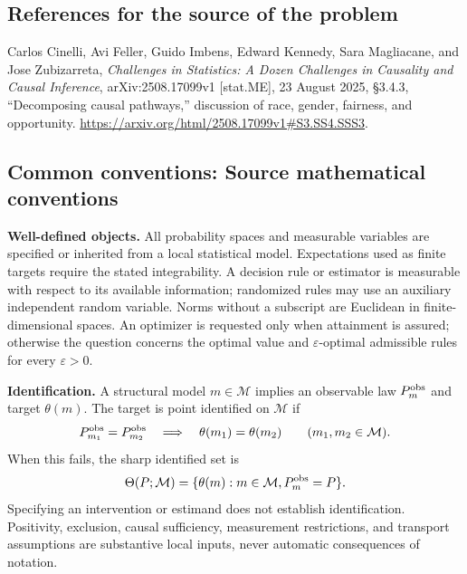 \documentclass[11pt,a4paper]{article}
\begin{document}
\subsection*{References for the source of the problem}
Carlos Cinelli, Avi Feller, Guido Imbens, Edward Kennedy, Sara Magliacane, and Jose Zubizarreta, \emph{Challenges in Statistics: A Dozen Challenges in Causality and Causal Inference}, arXiv:2508.17099v1 [stat.ME], 23 August 2025, \S3.4.3, ``Decomposing causal pathways,'' discussion of race, gender, fairness, and opportunity. \url{https://arxiv.org/html/2508.17099v1#S3.SS4.SSS3}.

\subsection*{Common conventions: Source mathematical conventions}

\textbf{Well-defined objects.}
All probability spaces and measurable variables are specified or inherited
from a local statistical model. Expectations used as finite targets require
the stated integrability. A decision rule or estimator is measurable with
respect to its available information; randomized rules may use an auxiliary
independent random variable. Norms without a subscript are Euclidean in
finite-dimensional spaces. An optimizer is requested only when attainment
is assured; otherwise the question concerns the optimal value and
$\varepsilon$-optimal admissible rules for every $\varepsilon>0$.

\textbf{Identification.}
A structural model $m\in\mathcal M$ implies an observable law
$P_m^{\rm obs}$ and target $\theta(m)$. The target is point identified on
$\mathcal M$ if
\[
 P_{m_1}^{\rm obs}=P_{m_2}^{\rm obs}
 \quad\Longrightarrow\quad\theta(m_1)=\theta(m_2)
 \qquad(m_1,m_2\in\mathcal M).
\]
When this fails, the sharp identified set is
\[
 \Theta(P;\mathcal M)=\{\theta(m):m\in\mathcal M,
                                  P_m^{\rm obs}=P\}.
\]
Specifying an intervention or estimand does not establish identification.
Positivity, exclusion, causal sufficiency, measurement restrictions, and
transport assumptions are substantive local inputs, never automatic
consequences of notation.
\end{document}
